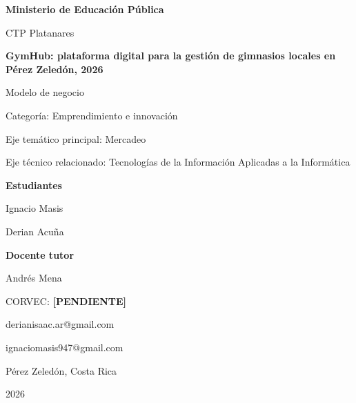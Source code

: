 \documentclass[12pt,letterpaper]{article}
\newcommand{\pendiente}{\textbf{[PENDIENTE]}}
\newcommand{\seccionnueva}[1]{\clearpage}
\begin{document}
\justifying
\hypersetup{pageanchor=false}

\begin{titlepage}
  \begin{singlespace}
  \thispagestyle{empty}
  \centering
  {\Large\textbf{Ministerio de Educación Pública}\par}
  \vspace{0.5cm}
  {\large CTP Platanares\par}
  \vspace{1.8cm}
  {\LARGE\textbf{GymHub: plataforma digital para la gestión de gimnasios locales en Pérez Zeledón, 2026}\par}
  \vspace{1.2cm}
  {\Large Modelo de negocio\par}
  \vspace{0.8cm}
  {\large Categoría: Emprendimiento e innovación\par}
  {\large Eje temático principal: Mercadeo\par}
  {\large Eje técnico relacionado: Tecnologías de la Información Aplicadas a la Informática\par}
  \vfill
  {\large\textbf{Estudiantes}\par}
  {\large Ignacio Masis\par}
  {\large Derian Acuña\par}
  \vspace{0.6cm}
  {\large\textbf{Docente tutor}\par}
  {\large Andrés Mena\par}
  \vspace{0.6cm}
  {\large CORVEC: \pendiente\par}
  \vspace{0.6cm}
  {\normalsize derianisaac.ar@gmail.com\par}
  {\normalsize ignaciomasis947@gmail.com\par}
  \vfill
  {\large Pérez Zeledón, Costa Rica\par}
  {\large 2026\par}
  \end{singlespace}
\end{titlepage}

\hypersetup{pageanchor=true}
\tableofcontents
\clearpage
\listoftables
\clearpage
\listoffigures

\clearpage
{}


\seccionnueva{secciones/02-idea-modelo-negocio}
\seccionnueva{secciones/03-antecedentes}
\seccionnueva{secciones/04-modelo-canvas}
\seccionnueva{secciones/05-viabilidad-tecnica}
\seccionnueva{secciones/06-costos-ingresos}
\seccionnueva{secciones/07-validacion-cumplimiento}
\seccionnueva{secciones/08-conclusiones}

\clearpage
\printbibliography[title={Referencias}]

\seccionnueva{secciones/09-anexos}
\end{document}
